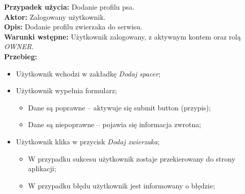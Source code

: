 
\noindent
\textbf{Przypadek użycia:} Dodanie profilu psa. \\
\textbf{Aktor:} Zalogowany użytkownik. \\
\textbf{Opis:} Dodanie profilu zwierzaka do serwisu. \\
\textbf{Warunki wstępne:} Użytkownik zalogowany, z aktywnym kontem oraz rolą \textit{OWNER}. \\
\textbf{Przebieg:}
\begin{itemize}[leftmargin=1cm]
    \item Użytkownik wchodzi w zakładkę \textit{Dodaj spacer};
    \item Użytkownik wypełnia formularz;
    \begin{itemize}
        \item Dane są poprawne -- aktywuje się submit button (przypis);
        \item Dane są niepoprawne -- pojawia się informacja zwrotna;
    \end{itemize}
    \item Użytkownik klika w przycisk \textit{Dodaj zwierzaka};
    \begin{itemize}
        \item W przypadku sukcesu użytkownik zostaje przekierowany do strony aplikacji;
        \item W przypadku błędu użytkownik jest informowany o błędzie;
    \end{itemize}
\end{itemize}

